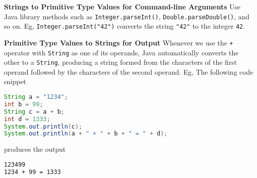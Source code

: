 \documentclass[8pt,a4paper,compress]{beamer}
\begin{document}
\begin{frame}[fragile]
\pause

\textbf{Strings to Primitive Type Values for Command-line Arguments} Use Java library methods such as \lstinline$Integer.parseInt()$, \lstinline$Double.parseDouble()$, and so on. Eg, \lstinline$Integer.parseInt("42")$ converts the string \lstinline$"42"$ to the integer \lstinline$42$.

\pause
\smallskip

\textbf{Primitive Type Values to Strings for Output} Whenever we use the \lstinline$+$ operator with \lstinline$String$ as one of its operands, Java automatically converts the other to a \lstinline$String$, producing a string formed from the characters of the first operand followed by the characters of the second operand. Eg, The following code snippet 

\begin{lstlisting}[language=Java]
String a = "1234";
int b = 99;
String c = a + b;
int d = 1333;
System.out.println(c);
System.out.println(a + " + " + b + " = " + d);
\end{lstlisting}

produces the output
\begin{lstlisting}[language=bash]
123499
1234 + 99 = 1333 
\end{lstlisting}
\end{frame}
\end{document}

